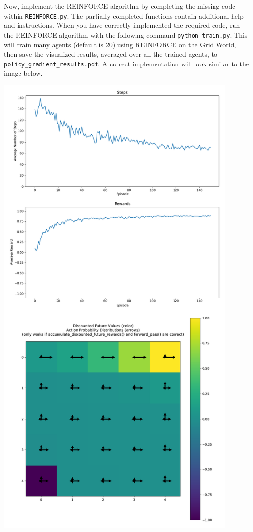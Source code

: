 \item {}

Now, implement the REINFORCE algorithm by completing the missing code within {\tt REINFORCE.py}.  The partially completed functions contain additional help and instructions.  When you have correctly implemented the required code, run the REINFORCE algorithm with the following command {\tt python train.py}.  This will train many agents (default is 20) using REINFORCE on the Grid World, then save the visualized results, averaged over all the trained agents, to {\tt policy\_gradient\_results.pdf}.  A correct implementation will look similar to the image below.

\begin{center}
  \includegraphics[width=12cm]{policy-gradient/policy_gradient_results.pdf}
\end{center}
